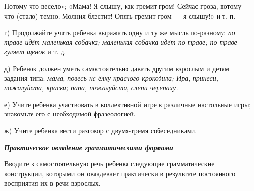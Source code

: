 \documentclass{book}
\renewcommand{\emph}[1]{\textit{#1}}
\begin{document}
Потому что весело»; «Мама! Я слышу, как гремит гром! Сейчас гроза,
потому что (стало) темно. Молния блестит! Опять гремит гром --- я
слышу!» и т. п.

г) Продолжайте учить ребенка выражать одну и ту же мысль по-разному:
\emph{по траве идёт маленькая собачка; маленькая собачка идёт по траве;
по траве гуляет щенок} и т. д.

д) Ребенок должен уметь самостоятельно давать другим взрослым и детям
задания типа: \emph{мама, повесь на ёлку красного крокодила; Ира,
принеси, пожалуйста, краски; папа, пожалуйста, слепи черепаху.}

е) Учите ребенка участвовать в коллективной игре в различные настольные
игры; знакомьте его с необходимой фразеологией.

ж) Учите ребенка вести разговор с двумя-тремя собеседниками.

\emph{\textbf{Практическое овладение грамматическими формами}}

Вводите в самостоятельную речь ребенка следующие грамматические
конструкции, которыми он овладевает практически в результате постоянного
восприятия их в речи взрослых.
\end{document}
